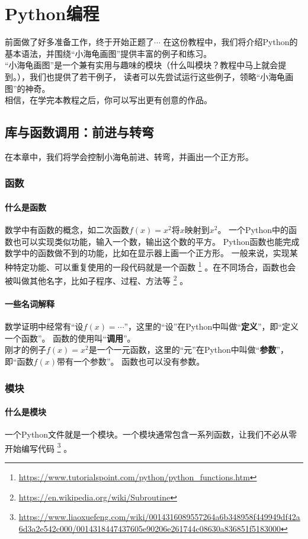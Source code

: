 \part{Python编程}
前面做了好多准备工作，终于开始正题了$\cdots$
在这份教程中，我们将介绍Python的基本语法，并围绕“小海龟画图”提供丰富的例子和练习。\\
“小海龟画图”是一个兼有实用与趣味的模块（什么叫模块？教程中马上就会提到。），我们也提供了若干例子，
读者可以先尝试运行这些例子，领略“小海龟画图”的神奇。\\
相信，在学完本教程之后，你可以写出更有创意的作品。
\chapter{库与函数调用：前进与转弯}
在本章中，我们将学会控制小海龟前进、转弯，并画出一个正方形。
\section{函数}
\subsection{什么是函数}
数学中有函数的概念，如二次函数$f(x) = x^2$将$x$映射到$x^2$。
一个Python中的函数也可以实现类似功能，输入一个数，输出这个数的平方。
Python函数也能完成数学中的函数做不到的功能，比如在显示器上画一个正方形。
一般来说，实现某种特定功能、可以重复使用的一段代码就是一个函数
\footnote{\url{https://www.tutorialspoint.com/python/python_functions.htm}}
。在不同场合，函数也会被叫做其他名字，比如子程序、过程、方法等
\footnote{\url{https://en.wikipedia.org/wiki/Subroutine}}
。\\
\subsection{一些名词解释}
数学证明中经常有“设$f(x)=\cdots$”，这里的“设”在Python中叫做“\textbf{定义}”，即“定义一个函数”。
函数的使用叫“\textbf{调用}”。\\
刚才的例子$f(x) = x^2$是一个一元函数，这里的“元”在Python中叫做“\textbf{参数}”，即“函数$f(x)$带有一个参数”。
函数也可以没有参数。
\section{模块}
\subsection{什么是模块}
一个Python文件就是一个模块。一个模块通常包含一系列函数，让我们不必从零开始编写代码
\footnote{\url{https://www.liaoxuefeng.com/wiki/0014316089557264a6b348958f449949df42a6d3a2e542c000/0014318447437605e90206e261744c08630a836851f5183000}}
。
